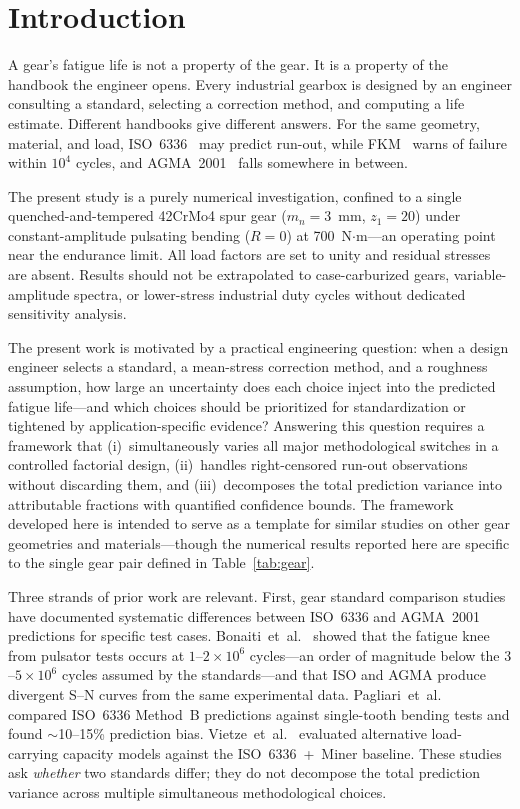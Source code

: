 \documentclass[12pt,a4paper]{article}
\begin{document}
\section{Introduction}
\label{sec:intro}

A gear's fatigue life is not a property of the gear. It is a property
of the handbook the engineer opens. Every industrial gearbox is designed
by an engineer consulting a standard, selecting a correction method, and
computing a life estimate. Different handbooks give different answers.
For the same geometry, material, and load, ISO~6336~\cite{iso6336} may
predict run-out, while FKM~\cite{fkm} warns of failure within $10^4$
cycles, and AGMA~2001~\cite{agma2001} falls somewhere in between.

The present study is a purely numerical investigation, confined to a
single quenched-and-tempered 42CrMo4 spur gear ($m_n=3$~mm,
$z_1=20$) under constant-amplitude pulsating bending ($R=0$) at
700~N$\cdot$m---an operating point near the endurance limit. All
load factors are set to unity and residual stresses are absent.
Results should not be extrapolated to case-carburized gears,
variable-amplitude spectra, or lower-stress industrial duty cycles
without dedicated sensitivity analysis.

The present work is motivated by a practical engineering question:
when a design engineer selects a standard, a mean-stress correction
method, and a roughness assumption, how large an uncertainty does each
choice inject into the predicted fatigue life---and which choices
should be prioritized for standardization or tightened by
application-specific evidence? Answering this question requires a
framework that (i)~simultaneously varies all major methodological
switches in a controlled factorial design, (ii)~handles right-censored
run-out observations without discarding them, and (iii)~decomposes the
total prediction variance into attributable fractions with quantified
confidence bounds. The framework developed here is intended to serve as
a template for similar studies on other gear geometries and
materials---though the numerical results reported here are specific
to the single gear pair defined in Table~\ref{tab:gear}.

Three strands of prior work are relevant. First, gear standard
comparison studies have documented systematic differences between
ISO~6336 and AGMA~2001 predictions for specific test cases.
Bonaiti~et~al.~\cite{bonaiti2024} showed that the fatigue knee from
pulsator tests occurs at $1$--$2\times10^6$ cycles---an order of
magnitude below the $3$--$5\times10^6$ cycles assumed by the
standards---and that ISO and AGMA produce divergent S--N curves from
the same experimental data. Pagliari~et~al.~\cite{pagliari2025}
compared ISO~6336 Method~B predictions against single-tooth bending
tests and found $\sim$10--15\% prediction bias. Vietze~et~al.~\cite{vietze2024}
evaluated alternative load-carrying capacity models against the
ISO~6336~+~Miner baseline. These studies ask \emph{whether} two
standards differ; they do not decompose the total prediction variance
across multiple simultaneous methodological choices.
\end{document}
